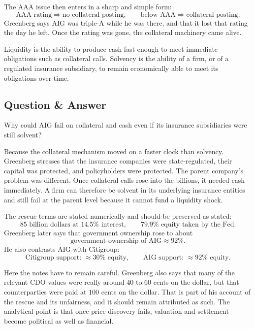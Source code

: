The AAA issue then enters in a sharp and simple form:
\begin{equation}
\text{AAA rating} \Rightarrow \text{no collateral posting},
\qquad
\text{below AAA} \Rightarrow \text{collateral posting}.
\end{equation}
Greenberg says AIG was triple-A while he was there, and that it lost that rating the day he left. Once the rating was gone, the collateral machinery came alive.

\begin{definition}
Liquidity is the ability to produce cash fast enough to meet immediate obligations such as collateral calls. Solvency is the ability of a firm, or of a regulated insurance subsidiary, to remain economically able to meet its obligations over time.
\end{definition}

\subsection{Question \& Answer}

Why could AIG fail on collateral and cash even if its insurance subsidiaries were still solvent?

Because the collateral mechanism moved on a faster clock than solvency. Greenberg stresses that the insurance companies were state-regulated, their capital was protected, and policyholders were protected. The parent company's problem was different. Once collateral calls rose into the billions, it needed cash immediately. A firm can therefore be solvent in its underlying insurance entities and still fail at the parent level because it cannot fund a liquidity shock.

The rescue terms are stated numerically and should be preserved as stated:
\begin{equation}
85\text{ billion dollars at } 14.5\% \text{ interest},
\qquad
79.9\% \text{ equity taken by the Fed}.
\end{equation}
Greenberg later says that government ownership rose to about
\begin{equation}
\text{government ownership of AIG} \approx 92\%.
\end{equation}
He also contrasts AIG with Citigroup:
\begin{equation}
\text{Citigroup support: } \approx 30\% \text{ equity},
\qquad
\text{AIG support: } \approx 92\% \text{ equity}.
\end{equation}

Here the notes have to remain careful. Greenberg also says that many of the relevant CDO values were really around \(40\) to \(60\) cents on the dollar, but that counterparties were paid at \(100\) cents on the dollar. That is part of his account of the rescue and its unfairness, and it should remain attributed as such. The analytical point is that once price discovery fails, valuation and settlement become political as well as financial.

